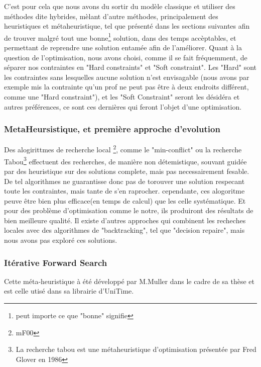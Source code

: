 \indent
C'est pour cela que nous avons du sortir du modèle classique et utiliser des méthodes dite hybrides, mèlant d'autre méthodes, principalement des heuristiques et métaheuristique, tel que présenté dans les sections suivantes afin de trouver malgré tout une bonne\footnote{peut importe ce que "bonne" signifie} solution, dans des temps accèptables, et permettant de reprendre une solution entamée afin de l'améliorer. \newline
Quant à la question de l'optimisation, nous avons choisi, comme il se fait fréquemment, de séparer nos contraintes en "Hard constraints" et "Soft constraint".  Les "Hard" sont les contraintes sans lesquelles aucune solution n'est envisagable (nous avons par exemple mis la contrainte qu'un prof ne peut pas être à deux endroits différent, comme une "Hard constraint"), et les "Soft Constraint" seront les désidéra et autres préférences, ce sont ces dernières qui feront l'objet d'une optimisation. 
\subsubsection{MetaHeursistique, et première approche d'evolution}
Des alogirittmes de recherche local \footnote{mF00}, comme le "min-conflict" ou la recherche Tabou\footnote{La recherche tabou est une métaheuristique d'optimisation présentée par Fred Glover en 1986} effectuent des recherches, de manière non détemistique, souvant guidée par des heuristique sur des solutions complete, mais pas necessairement fesable.  De tel algorithmes ne guarantisse donc pas de torouver une solution respecant toute les contraintes, mais tante de s'en raprocher. cependante, ces alogoritme peuve être bien plus efficace(en temps de calcul) que les celle systématique. Et pour des problème d'optimisation comme le notre, ils produiront des résultats de bien meilleure qualité.
Il existe d'autres approches qui combinent les recheches locales avec des algorithmes de "backtracking", tel que "decision repaire", mais nous avons pas exploré ces solutions.

\subsubsection{Itérative Forward Search}
Cette méta-heuristique à été développé par M.Muller dans le cadre de sa thèse et est celle utisé dans sa librairie d'UniTime. 

